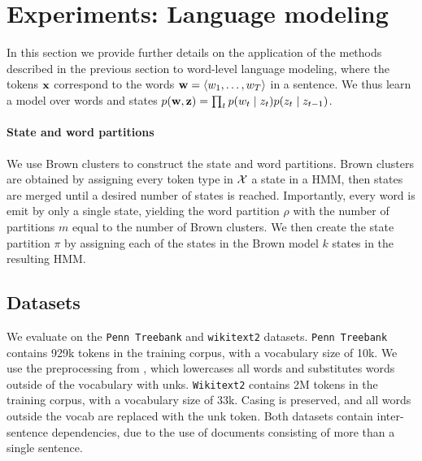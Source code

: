 \documentclass[11pt,a4paper]{article}
\begin{document}


\section{Experiments: Language modeling}
\label{sec:experiments}
In this section we provide further details on the application
of the methods described in the previous section
to word-level language modeling,
where the tokens $\mathbf{x}$ correspond to the words
$\mathbf{w} = \langle w_1,\ldots,w_T \rangle$ in a sentence.
We thus learn a model over words and states
$p(\mathbf{w},\mathbf{z}) = \prod_t p(w_t\mid z_t)p(z_t \mid z_{t-1})$.

\paragraph{State and word partitions}
We use Brown clusters \citep{brown1992,liang2005brown} to construct the state and word partitions.
Brown clusters are obtained by assigning every token type in $\mathcal{X}$ a state in a HMM,
then states are merged until a desired number of states is reached.
Importantly, every word is emit by only a single state, yielding the word partition $\rho$
with the number of partitions $m$ equal to the number of Brown clusters.
We then create the state partition $\pi$ by assigning each of the states in the
Brown model $k$ states in the resulting HMM.


\subsection{Datasets}
We evaluate on the \texttt{Penn Treebank} \citep{ptb}
and \texttt{wikitext2} \citep{wikitext} datasets.
\texttt{Penn Treebank} contains 929k tokens in the training corpus,
with a vocabulary size of 10k.
We use the preprocessing from \citet{mikolov-2011},
which lowercases all words and substitutes words outside of the vocabulary
with unks. 
\texttt{Wikitext2} contains 2M tokens in the training corpus,
with a vocabulary size of 33k.
Casing is preserved, and all words outside the vocab are replaced with the unk token.
Both datasets contain inter-sentence dependencies,
due to the use of documents consisting of more than a single sentence.
\end{document}
